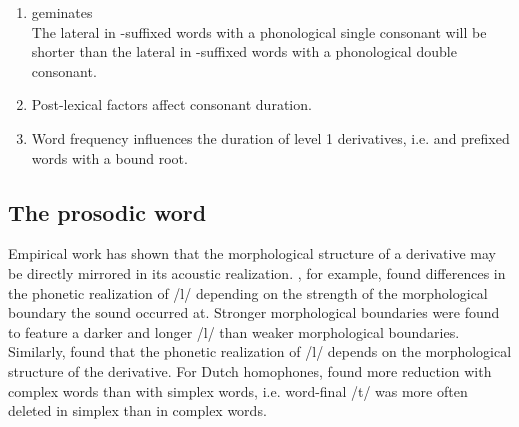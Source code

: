 \begin{enumerate}
		
	\item  {} geminates \\
	The lateral in -suffixed words with a phonological single consonant will be shorter than the lateral in  -suffixed words with a phonological double consonant. 
	
	\item Post-lexical factors affect consonant duration.
	


	\item Word frequency influences the duration of level 1 derivatives, i.e.  and prefixed words with a bound root.
	
\end{enumerate}



\subsection{The prosodic word} {\label{prosodic word}}


Empirical work has shown that the morphological structure of a derivative may be directly mirrored in its acoustic realization. %
\cite{Sproat.1993b}, for example, found differences in the phonetic realization of /l/ depending on the strength of the morphological boundary the sound occurred at. Stronger morphological boundaries were found to feature a darker and longer /l/ than weaker morphological boundaries. Similarly, \cite{LeeKim.2013} found that the phonetic realization of /l/ depends on the morphological structure of the derivative. 
For Dutch homophones, \cite{Schuppler.2012} found more reduction with complex words than with simplex words, i.e. word-final /t/ was more often deleted in simplex than in complex words.

